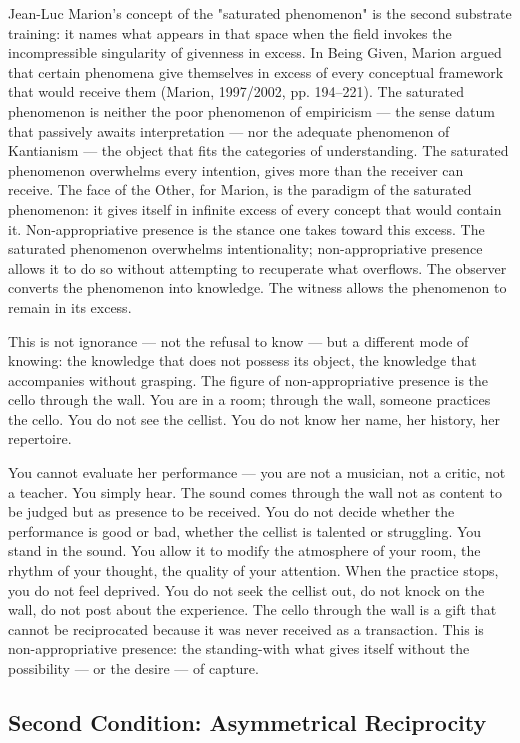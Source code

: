 Jean-Luc Marion's concept of the "saturated phenomenon" is the second substrate training: it names what appears in that space when the field invokes the incompressible singularity of givenness in excess. In Being Given, Marion argued that certain phenomena give themselves in excess of every conceptual framework that would receive them (Marion, 1997/2002, pp. 194–221). The saturated phenomenon is neither the poor phenomenon of empiricism — the sense datum that passively awaits interpretation — nor the adequate phenomenon of Kantianism — the object that fits the categories of understanding. The saturated phenomenon overwhelms every intention, gives more than the receiver can receive. The face of the Other, for Marion, is the paradigm of the saturated phenomenon: it gives itself in infinite excess of every concept that would contain it. Non-appropriative presence is the stance one takes toward this excess. The saturated phenomenon overwhelms intentionality; non-appropriative presence allows it to do so without attempting to recuperate what overflows. The observer converts the phenomenon into knowledge. The witness allows the phenomenon to remain in its excess.

This is not ignorance — not the refusal to know — but a different mode of knowing: the knowledge that does not possess its object, the knowledge that accompanies without grasping. The figure of non-appropriative presence is the cello through the wall. You are in a room; through the wall, someone practices the cello. You do not see the cellist. You do not know her name, her history, her repertoire.

You cannot evaluate her performance — you are not a musician, not a critic, not a teacher. You simply hear. The sound comes through the wall not as content to be judged but as presence to be received. You do not decide whether the performance is good or bad, whether the cellist is talented or struggling. You stand in the sound. You allow it to modify the atmosphere of your room, the rhythm of your thought, the quality of your attention. When the practice stops, you do not feel deprived. You do not seek the cellist out, do not knock on the wall, do not post about the experience. The cello through the wall is a gift that cannot be reciprocated because it was never received as a transaction. This is non-appropriative presence: the standing-with what gives itself without the possibility — or the desire — of capture.

\subsection{Second Condition: Asymmetrical Reciprocity}

